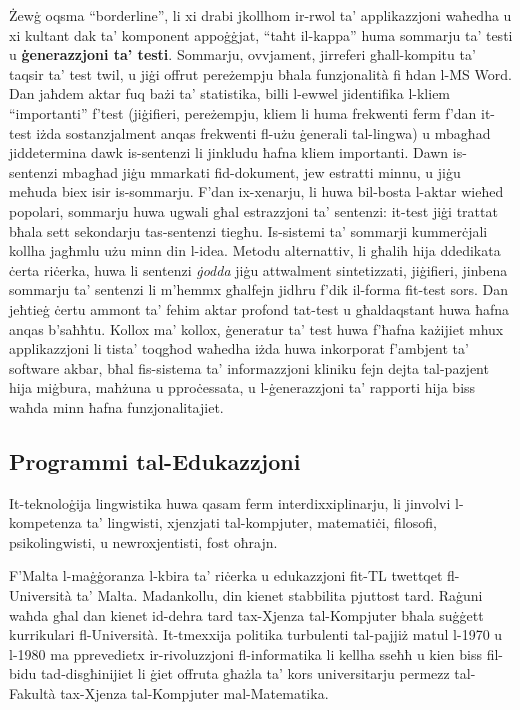 \begin{multicols}{2}
Żewġ oqsma ``borderline'', li xi drabi jkollhom ir-rwol ta’ applikazzjoni waħedha u xi kultant dak ta’ komponent appoġġjat, ``taħt il-kappa'' huma sommarju ta’ testi u \textbf{ġenerazzjoni ta’ testi}. Sommarju, ovvjament, jirreferi għall-kompitu ta’ taqsir ta’ test twil, u jiġi offrut pereżempju bħala funzjonalità fi ħdan l-MS Word. Dan jaħdem aktar fuq bażi ta’ statistika, billi l-ewwel jidentifika l-kliem ``importanti'' f’test (jiġifieri, pereżempju, kliem li huma frekwenti ferm f'dan it-test iżda sostanzjalment anqas frekwenti fl-użu ġenerali tal-lingwa) u mbagħad jiddetermina dawk is-sentenzi li jinkludu ħafna kliem importanti. Dawn is-sentenzi mbagħad jiġu mmarkati fid-dokument, jew estratti minnu, u jiġu meħuda biex isir is-sommarju. F’dan ix-xenarju, li huwa bil-bosta l-aktar wieħed popolari, sommarju huwa ugwali għal estrazzjoni ta’ sentenzi: it-test jiġi trattat bħala sett sekondarju tas-sentenzi tiegħu. Is-sistemi ta’ sommarji kummerċjali kollha jagħmlu użu minn din l-idea. Metodu alternattiv, li għalih hija ddedikata ċerta riċerka, huwa li sentenzi \emph{ġodda} jiġu attwalment sintetizzati, jiġifieri, jinbena sommarju ta’ sentenzi li m’hemmx għalfejn jidhru f’dik il-forma fit-test sors. Dan jeħtieġ ċertu ammont ta’ fehim aktar profond tat-test u għaldaqstant huwa ħafna anqas b'saħħtu. Kollox ma’ kollox, ġeneratur ta’ test huwa f’ħafna każijiet mhux applikazzjoni li tista’ toqgħod waħedha iżda huwa inkorporat f’ambjent ta’ software akbar, bħal fis-sistema ta’ informazzjoni kliniku fejn dejta tal-pazjent hija miġbura, maħżuna u pproċessata, u l-ġenerazzjoni ta’ rapporti hija biss waħda minn ħafna funzjonalitajiet.

\subsection{Programmi tal-Edukazzjoni}

It-teknoloġija lingwistika huwa qasam ferm interdixxiplinarju, li jinvolvi l-kompetenza ta’ lingwisti, xjenzjati tal-kompjuter, matematiċi, filosofi, psikolingwisti, u newroxjentisti, fost oħrajn. 

F'Malta l-maġġoranza l-kbira ta’ riċerka u edukazzjoni fit-TL twettqet fl-Università ta’ Malta. Madankollu, din kienet stabbilita pjuttost tard. Raġuni waħda għal dan kienet id-dehra tard tax-Xjenza tal-Kompjuter bħala suġġett kurrikulari fl-Università. It-tmexxija politika turbulenti tal-pajjiż matul l-1970 u l-1980 ma pprevedietx ir-rivoluzzjoni fl-informatika li kellha sseħħ u kien biss fil-bidu tad-disgħinijiet li ġiet offruta għażla ta’ kors universitarju permezz tal-Fakultà tax-Xjenza tal-Kompjuter mal-Matematika.


\end{multicols}
